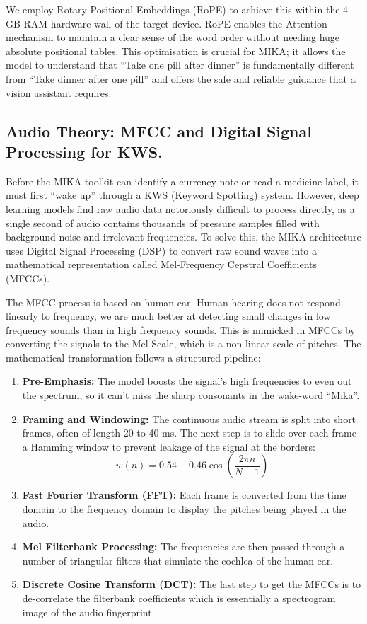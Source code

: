 \documentclass[12pt,a4paper]{report}
\begin{document}
\noindent We employ Rotary Positional Embeddings (RoPE) to achieve this within the 4 GB RAM hardware wall of the target device. RoPE enables the Attention mechanism to maintain a clear sense of the word order without needing huge absolute positional tables.
This optimisation is crucial for MIKA; it allows the model to understand that “Take one pill after dinner” is fundamentally different from “Take dinner after one pill” and offers the safe and reliable guidance that a vision assistant requires. 

\subsection{Audio Theory: MFCC and Digital Signal Processing for KWS.}
 
Before the MIKA toolkit can identify a currency note or read a medicine label, it must first “wake up” through a KWS (Keyword Spotting) system. However, deep learning models find raw audio data notoriously difficult to process directly, as a single second of audio contains thousands of pressure samples filled with background noise and irrelevant frequencies. To solve this, the MIKA architecture uses Digital Signal Processing (DSP) to convert raw sound waves into a mathematical representation called Mel-Frequency Cepstral Coefficients (MFCCs). 

 
\noindent The MFCC process is based on human ear. Human hearing does not respond linearly to frequency, we are much better at detecting small changes in low frequency sounds than in high frequency sounds. This is mimicked in MFCCs by converting the signals to the Mel Scale, which is a non-linear scale of pitches. The mathematical transformation follows a structured pipeline:
 
\begin{enumerate}
    \item \textbf{Pre-Emphasis:} The model boosts the signal’s high frequencies to even out the spectrum, so it can’t miss the sharp consonants in the wake-word “Mika”.
    \item \textbf{Framing and Windowing:} The continuous audio stream is split into short frames, often of length 20 to 40 ms. The next step is to slide over each frame a Hamming window to prevent leakage of the signal at the borders:
    \begin{equation}
    w(n) = 0.54 - 0.46 \cos\left(\frac{2\pi n}{N-1}\right)
    \end{equation}
    \item \textbf{Fast Fourier Transform (FFT):} Each frame is converted from the time domain to the frequency domain to display the pitches being played in the audio.
    \item \textbf{Mel Filterbank Processing:} The frequencies are then passed through a number of triangular filters that simulate the cochlea of the human ear.
    \item \textbf{Discrete Cosine Transform (DCT):} The last step to get the MFCCs is to de-correlate the filterbank coefficients which is essentially a spectrogram image of the audio fingerprint.
\end{enumerate}
 
\end{document}
